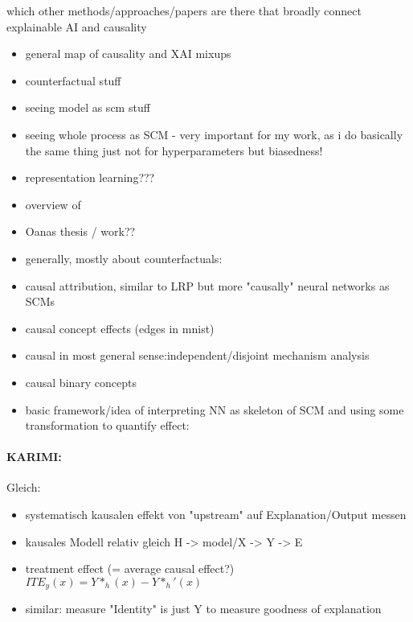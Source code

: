       {\color{red} which other methods/approaches/papers are there that broadly connect explainable AI and causality }
      
\begin{itemize}
      \item general map of causality and XAI mixups
      \item counterfactual stuff
      \item seeing model as scm stuff \cite{Chattopadhyay2019}
      \item seeing whole process as SCM \cite{Karimi2023} - very important for my work, as i do basically the same thing just not for hyperparameters but biasedness!
      \item representation learning??? 
      \item overview of \cite{Schoelkopf2019}
      \item Oanas thesis / work??
\end{itemize}

\begin{itemize}
      \item generally, mostly about counterfactuals: \cite{Moraffah2020a}
      \item causal attribution, similar to LRP but more "causally" neural networks as SCMs \cite{Chattopadhyay2019}
      \item causal concept effects (edges in mnist) \cite{Goyal2019}
      \item causal in most general sense:independent/disjoint mechanism analysis \cite{Leemann2023} \cite{Leemann2022}
      \item causal binary concepts \cite{Tran2022}
      \item basic framework/idea of interpreting NN as skeleton of SCM and using some transformation to quantify effect:\cite{Narendra2018}
\end{itemize}


\paragraph*{KARIMI:}
\cite{Karimi2023}
Gleich:

\begin{itemize}
      \item systematisch kausalen effekt von "upstream" auf Explanation/Output messen
      \item kausales Modell relativ gleich H -> model/X -> Y -> E
      \item treatment effect (= average causal effect?) $ITE_y(x) = Y*_h(x) - Y*_h'(x)$
      \item similar: measure "Identity" is just Y to measure goodness of explanation
\end{itemize}

